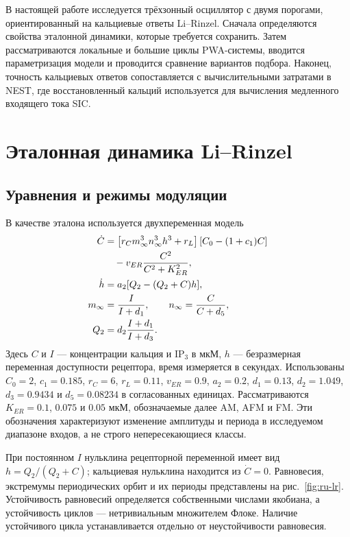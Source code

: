В настоящей работе исследуется трёхзонный осциллятор с двумя порогами, ориентированный на кальциевые ответы Li--Rinzel. Сначала определяются свойства эталонной динамики, которые требуется сохранить. Затем рассматриваются локальные и большие циклы PWA-системы, вводится параметризация модели и проводится сравнение вариантов подбора. Наконец, точность кальциевых ответов сопоставляется с вычислительными затратами в NEST, где восстановленный кальций используется для вычисления медленного входящего тока SIC.

\section{Эталонная динамика Li--Rinzel}
\subsection{Уравнения и режимы модуляции}
В качестве эталона используется двухпеременная модель~\cite{LiRinzel1994,DePitta2009}
\begin{align}
\dot C&=\left[r_C m_\infty^3 n_\infty^3h^3+r_L\right]
       [C_0-(1+c_1)C]\notag\\
       &\quad-v_{ER}\frac{C^2}{C^2+K_{ER}^2},\\
\dot h&=a_2[Q_2-(Q_2+C)h],\\
m_\infty&=\frac{I}{I+d_1},\qquad n_\infty=\frac{C}{C+d_5},\\
Q_2&=d_2\frac{I+d_1}{I+d_3}.
\end{align}
Здесь $C$ и $I$ --- концентрации кальция и IP$_3$ в мкМ, $h$ --- безразмерная переменная доступности рецептора, время измеряется в секундах. Использованы $C_0=2$, $c_1=0.185$, $r_C=6$, $r_L=0.11$, $v_{ER}=0.9$, $a_2=0.2$, $d_1=0.13$, $d_2=1.049$, $d_3=0.9434$ и $d_5=0.08234$ в согласованных единицах. Рассматриваются $K_{ER}=0.1$, $0.075$ и $0.05$ мкМ, обозначаемые далее AM, AFM и FM. Эти обозначения характеризуют изменение амплитуды и периода в исследуемом диапазоне входов, а не строго непересекающиеся классы.

При постоянном $I$ нульклина рецепторной переменной имеет вид $h=Q_2/(Q_2+C)$; кальциевая нульклина находится из $\dot C=0$. Равновесия, экстремумы периодических орбит и их периоды представлены на рис.~\ref{fig:ru-lr}. Устойчивость равновесий определяется собственными числами якобиана, а устойчивость циклов --- нетривиальным множителем Флоке. Наличие устойчивого цикла устанавливается отдельно от неустойчивости равновесия.

